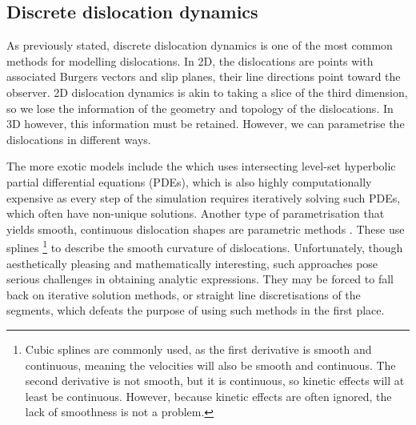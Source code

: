 \subsection{Discrete dislocation dynamics}
\label{ss:ddd}

As previously stated, discrete dislocation dynamics is one of the most common methods for modelling dislocations. In 2D, the dislocations are points with associated Burgers vectors and slip planes, their line directions point toward the observer. 2D dislocation dynamics is akin to taking a slice of the third dimension, so we lose the information of the geometry and topology of the dislocations. In 3D however, this information must be retained. However, we can parametrise the dislocations in different ways.

The more exotic models include the  \cite{ddd_inclusion_as_force} which uses intersecting level-set hyperbolic partial differential equations (PDEs), which is also highly computationally expensive as every step of the simulation requires iteratively solving such PDEs, which often have non-unique solutions. Another type of parametrisation that yields smooth, continuous dislocation shapes are parametric methods \cite{parametricDDD,parametricDDD2}. These use splines \footnote{Cubic splines are commonly used, as the first derivative is smooth and continuous, meaning the velocities will also be smooth and continuous. The second derivative is not smooth, but it is continuous, so kinetic effects will at least be continuous. However, because kinetic effects are often ignored, the lack of smoothness is not a problem.} to describe the smooth curvature of dislocations. Unfortunately, though aesthetically pleasing and mathematically interesting, such approaches pose serious challenges in obtaining analytic expressions. They may be forced to fall back on iterative solution methods, or straight line discretisations of the segments, which defeats the purpose of using such methods in the first place.

